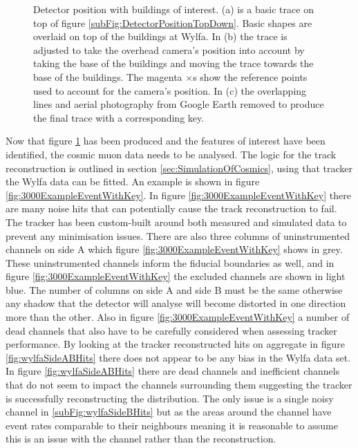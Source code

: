 \begin{figure}[!h]
\begin{subfigure}{1.0\textwidth}
  \captionsetup{width=.9\linewidth}
  \caption{}
  \label{subFig:wylfaTraceStep4}
\end{subfigure}
\caption[Detector position with buildings of interest.]{Detector position with buildings of interest. (a) is a basic trace on top of figure \ref{subFig:DetectorPositionTopDown}. Basic shapes are overlaid on top of the buildings at Wylfa. In (b) the trace is adjusted to take the overhead camera's position into account by taking the base of the buildings and moving the trace towards the base of the buildings. The magenta $\times$s show the reference points used to account for the camera's position. In (c) the overlapping lines and aerial photography from Google Earth removed to produce the final trace with a corresponding key.}
\label{fig:wylfaTraceSteps1-4}
\end{figure}


Now that figure \ref{subFig:wylfaTraceStep4} has been produced and the features of interest have been identified, the cosmic muon data needs to be analysed. The logic for the track reconstruction is outlined in section \ref{sec:SimulationOfCosmics}, using that tracker the Wylfa data can be fitted. An example is shown in figure \ref{fig:3000ExampleEventWithKey}. In figure \ref{fig:3000ExampleEventWithKey} there are many noise hits that can potentially cause the track reconstruction to fail. The tracker has been custom-built around both measured and simulated data to prevent any minimisation issues. There are also three columns of uninstrumented channels on side A which figure \ref{fig:3000ExampleEventWithKey} shows in grey. These uninstrumented channels inform the fiducial boundaries as well, and in figure \ref{fig:3000ExampleEventWithKey} the excluded channels are shown in light blue. The number of columns on side A and side B must be the same otherwise any shadow that the detector will analyse will become distorted in one direction more than the other. Also in figure \ref{fig:3000ExampleEventWithKey} a number of dead channels that also have to be carefully considered when assessing tracker performance. By looking at the tracker reconstructed hits on aggregate in figure \ref{fig:wylfaSideABHits} there does not appear to be any bias in the Wylfa data set. In figure \ref{fig:wylfaSideABHits} there are dead channels and inefficient channels that do not seem to impact the channels surrounding them suggesting the tracker is successfully reconstructing the distribution. The only issue is a single noisy channel in \ref{subFig:wylfaSideBHits} but as the areas around the channel have event rates comparable to their neighbours meaning it is reasonable to assume this is an issue with the channel rather than the reconstruction. 

